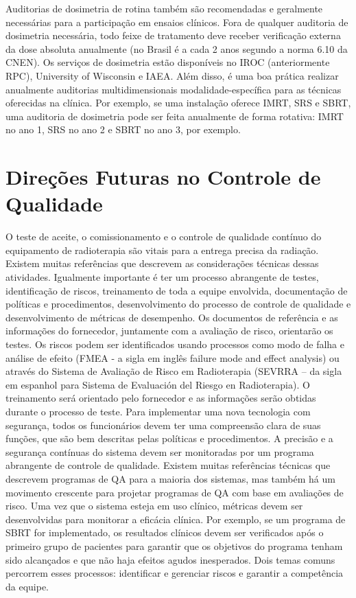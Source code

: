 \documentclass[11pt,a4paper]{article}
\newcounter{exemplo}
\begin{document}
	Auditorias de dosimetria de rotina também são recomendadas e geralmente necessárias para a participação em ensaios clínicos. Fora de qualquer auditoria de dosimetria necessária, todo feixe de tratamento deve receber verificação externa da dose absoluta anualmente (no Brasil é a cada 2 anos segundo a norma 6.10 da CNEN). Os serviços de dosimetria estão disponíveis no IROC (anteriormente RPC), University of Wisconsin e IAEA. Além disso, é uma boa prática realizar anualmente auditorias multidimensionais modalidade-específica para as técnicas oferecidas na clínica. Por exemplo, se uma instalação oferece IMRT, SRS e SBRT, uma auditoria de dosimetria pode ser feita anualmente de forma rotativa: IMRT no ano 1, SRS no ano 2 e SBRT no ano 3, por exemplo.

\section{Direções Futuras no Controle de Qualidade}

	O teste de aceite, o comissionamento e o controle de qualidade contínuo do equipamento de radioterapia são vitais para a entrega precisa da radiação. Existem muitas referências que descrevem as considerações técnicas dessas atividades. Igualmente importante é ter um processo abrangente de testes, identificação de riscos, treinamento de toda a equipe envolvida, documentação de políticas e procedimentos, desenvolvimento do processo de controle de qualidade e desenvolvimento de métricas de desempenho. Os documentos de referência e as informações do fornecedor, juntamente com a avaliação de risco, orientarão os testes. Os riscos podem ser identificados usando processos como modo de falha e análise de efeito (FMEA - a sigla em inglês failure mode and effect analysis) ou através do Sistema de Avaliação de Risco em Radioterapia (SEVRRA – da sigla em espanhol para Sistema de Evaluación del Riesgo en Radioterapia). O treinamento será orientado pelo fornecedor e as informações serão obtidas durante o processo de teste. Para implementar uma nova tecnologia com segurança, todos os funcionários devem ter uma compreensão clara de suas funções, que são bem descritas pelas políticas e procedimentos. A precisão e a segurança contínuas do sistema devem ser monitoradas por um programa abrangente de controle de qualidade. Existem muitas referências técnicas que descrevem programas de QA para a maioria dos sistemas, mas também há um movimento crescente para projetar programas de QA com base em avaliações de risco. Uma vez que o sistema esteja em uso clínico, métricas devem ser desenvolvidas para monitorar a eficácia clínica. Por exemplo, se um programa de SBRT for implementado, os resultados clínicos devem ser verificados após o primeiro grupo de pacientes para garantir que os objetivos do programa tenham sido alcançados e que não haja efeitos agudos inesperados. Dois temas comuns percorrem esses processos: identificar e gerenciar riscos e garantir a competência da equipe.
\end{document}
